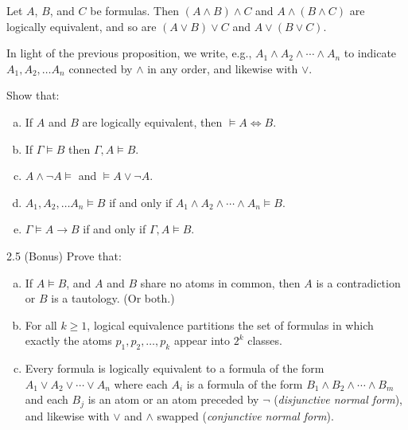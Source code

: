 \documentclass{article}
\begin{document}
\begin{proposition}
    Let $A$, $B$, and $C$ be formulas. Then $(A \wedge B) \wedge C$ and $A \wedge (B \wedge C)$ are logically equivalent, and so are $(A \vee B) \vee C$ and $A \vee (B \vee C)$.
\end{proposition}

\begin{notation}
    In light of the previous proposition, we write, e.g., $A_1 \wedge A_2 \wedge \cdots \wedge A_n$ to indicate $A_1, A_2, \dots A_n$ connected by $\wedge$ in any order, and likewise with $\vee$. 
\end{notation}

\begin{prob}{2.4}
    Show that:
    \begin{enumerate}[a)]
    \item If $A$ and $B$ are logically equivalent, then $\models A \iff B$.
    \item If $\Gamma \models B$ then $\Gamma, A \models B$.
    \item $A \wedge \neg A \models$ and $\models A \vee \neg A$.
    \item $A_1, A_2, \dots A_n \models B$ if and only if $A_1 \wedge A_2 \wedge \cdots \wedge A_n \models B$.
    \item $\Gamma \models A \to B$ if and only if $\Gamma, A \models B$.
    \end{enumerate}
\end{prob}

\begin{prob}{2.5 (Bonus)}
    Prove that:
    \begin{enumerate}[a)]
    \item If $A \models B$, and $A$ and $B$ share no atoms in common, then $A$ is a contradiction or $B$ is a tautology. (Or both.)
    \item For all $k \geq 1$, logical equivalence partitions the set of formulas in which exactly the atoms $p_1, p_2, \dots, p_k$ appear into $2^k$ classes.
    \item Every formula is logically equivalent to a formula of the form $A_1 \vee A_2 \vee \cdots \vee A_n$ where each $A_i$ is a formula of the form $B_1 \wedge B_2 \wedge \cdots \wedge B_m$ and each $B_j$ is an atom or an atom preceded by $\neg$ (\emph{disjunctive normal form}), and likewise with $\vee$ and $\wedge$ swapped (\emph{conjunctive normal form}).
    \end{enumerate}
\end{prob}
\end{document}
